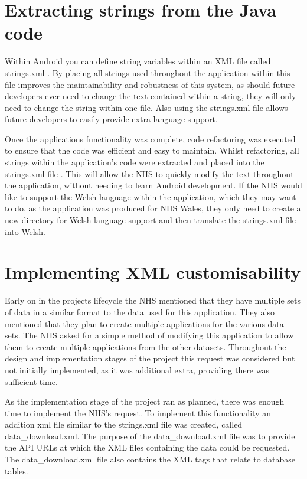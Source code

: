 \section{Extracting strings from the Java code}

Within Android you can define string variables within an XML file called strings.xml \cite{strings_xml}. By placing all strings used throughout the application within this file improves the maintainability and robustness of this system, as should future developers ever need to change the text contained within a string, they will only need to change the string within one file. Also using the strings.xml file allows future developers to easily provide extra language support\cite{strings_xml}.

Once the applications functionality was complete, code refactoring was executed to ensure that the code was efficient and easy to maintain. Whilst refactoring, all strings within the application’s code were extracted and placed into the strings.xml file \cite{strings_xml}. This will allow the NHS to quickly modify the text throughout the application, without needing to learn Android development. If the NHS would like to support the Welsh language within the application, which they may want to do, as the application was produced for NHS Wales, they only need to create a new directory for Welsh language support and then translate the strings.xml file into Welsh.

\section{Implementing XML customisability}
Early on in the projects lifecycle the NHS mentioned that they have multiple sets of data in a similar format to the data used for this application. They also mentioned that they plan to create multiple applications for the various data sets. The NHS asked for a simple method of modifying this application to allow them to create multiple applications from the other datasets. Throughout the design and implementation stages of the project this request was considered but not initially implemented, as it was additional extra, providing there was sufficient time.

As the implementation stage of the project ran as planned, there was enough time to implement the NHS’s request. To implement this functionality an addition xml file similar to the strings.xml \cite{strings_xml} file was created, called data\_download.xml. The purpose of the data\_download.xml file was to provide the API URLs at which the XML files containing the data could be requested. The data\_download.xml file also contains the XML tags that relate to database tables.


